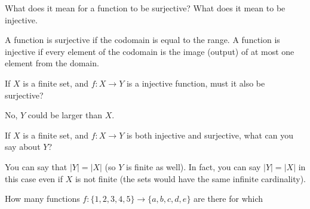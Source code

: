 \begin{squestions}
\begin{answer}
	\end{answer}
	


\question What does it mean for a function to be surjective?  What does it mean to be injective.

	\begin{answer}
		A function is surjective if the codomain is equal to the range.  A function is injective if every element of the codomain is the image (output) of at most one element from the domain.
	\end{answer}
	
	
	
	
	
\question If $X$ is a finite set, and $f: X \to Y$ is a injective function, must it also be surjective?

	\begin{answer}
		No, $Y$ could be larger than $X$.
	\end{answer}
	
	
	



\question If $X$ is a finite set, and $f: X \to Y$ is both injective and surjective, what can you say about $Y$?

	\begin{answer}
		You can say that $|Y| = |X|$ (so $Y$ is finite as well).  In fact, you can say $|Y| = |X|$ in this case even if $X$ is not finite (the sets would have the same infinite cardinality).
	\end{answer}
	
	
	

	


\question How many functions $f: \{1,2,3,4,5\} \to \{a,b,c,d,e\}$ are there for which
\end{squestions}

